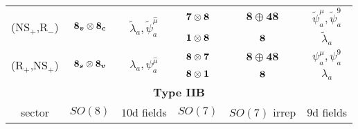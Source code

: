 {\begin{tabular}{|cccccc|}
		\multicolumn{1}{|c|}{\multirow{2}{*}{(NS$_+$,R$_-$)}}  & \multicolumn{1}{c|}{\multirow{2}{*}{$\boldsymbol{8_v} \otimes \boldsymbol{8_c}$}} & \multicolumn{1}{c|}{\multirow{2}{*}{$\tilde{\lambda}_a, \tilde{\psi}^{\hat{\mu}}_a$}}                  & \multicolumn{1}{c|}{$\boldsymbol{7} \otimes \boldsymbol{8}$}                          & \multicolumn{1}{c|}{$\boldsymbol{8} \oplus\boldsymbol{48}$}                           & $\tilde{\psi}^\mu_a, \tilde{\psi}^9_a$     \\ \cline{4-6}
		\multicolumn{1}{|c|}{}                                 & \multicolumn{1}{c|}{}                                 & \multicolumn{1}{c|}{}                                                                                  & \multicolumn{1}{c|}{$\boldsymbol{1} \otimes \boldsymbol{8}$}                              & \multicolumn{1}{c|}{$\boldsymbol{8}$}                                                         & $\tilde{\lambda}_a$                        \\ \hline
		\multicolumn{1}{|c|}{\multirow{2}{*}{(R$_+$,NS$_+$)}}  & \multicolumn{1}{c|}{\multirow{2}{*}{$\boldsymbol{8_s}\otimes\boldsymbol{8_v}$}}   & \multicolumn{1}{c|}{\multirow{2}{*}{${\lambda}_a, {\psi}^{\hat{\mu}}_a$}}                              & \multicolumn{1}{c|}{$\boldsymbol{8}\otimes\boldsymbol{7}$}                            & \multicolumn{1}{c|}{$\boldsymbol{8} \oplus\boldsymbol{48}$}                           & $\psi^\mu_a, \psi^9_a$                     \\ \cline{4-6}
		\multicolumn{1}{|c|}{}                                 & \multicolumn{1}{c|}{}                                 & \multicolumn{1}{c|}{}                                                                                  & \multicolumn{1}{c|}{$\boldsymbol{8} \otimes \boldsymbol{1}$}                              & \multicolumn{1}{c|}{$\boldsymbol{8}$}                                                         & $\lambda_a$                                \\ \hline
		\multicolumn{6}{|c|}{\textbf{Type IIB}}                                                                                                                                                                                                                                                                                                                                                                                                       \\ \hline
		\multicolumn{1}{|c|}{sector}                           & \multicolumn{1}{c|}{$SO(8)$}                          & \multicolumn{1}{c|}{$10$d fields}                                                                      & \multicolumn{1}{c|}{$SO(7)$}                                          & \multicolumn{1}{c|}{$SO(7)$ irrep}                                                    & $9$d fields                                \\ \hline

\end{tabular}}
